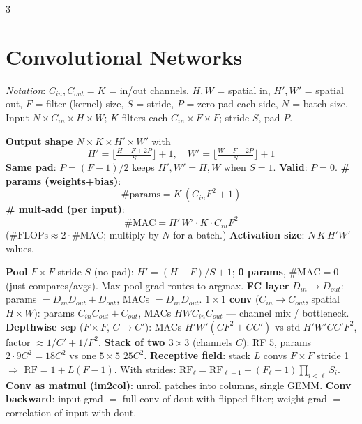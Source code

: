\documentclass[a4paper,9pt,landscape]{scrartcl}
\begin{document}
\begin{multicols*}{3}
\section{Convolutional Networks}
\textit{Notation}: $C_{in},C_{out}{=}K$ = in/out channels, $H,W$ = spatial in, $H',W'$ = spatial out, $F$ = filter (kernel) size, $S$ = stride, $P$ = zero-pad each side, $N$ = batch size.
Input $N\!\times\!C_{in}\!\times\!H\!\times\!W$; $K$ filters each $C_{in}\!\times\!F\!\times\!F$; stride $S$, pad $P$.

\textbf{Output shape} $N\!\times\!K\!\times\!H'\!\times\!W'$ with
$$H'=\Big\lfloor\tfrac{H-F+2P}{S}\Big\rfloor+1,\quad W'=\Big\lfloor\tfrac{W-F+2P}{S}\Big\rfloor+1$$
\textbf{Same pad}: $P=(F{-}1)/2$ keeps $H',W'{=}H,W$ when $S{=}1$. \textbf{Valid}: $P{=}0$.
\textbf{\# params (weights+bias)}:
$$\#\text{params}=K\,(C_{in}F^2+1)$$
\textbf{\# mult-add (per input)}:
$$\#\text{MAC}=H'\,W'\cdot K\cdot C_{in}F^2$$
($\#\text{FLOPs}\!\approx\!2\cdot\#\text{MAC}$; multiply by $N$ for a batch.)
\textbf{Activation size}: $N\,K\,H'W'$ values.

\textbf{Pool} $F\!\times\!F$ stride $S$ (no pad): $H'{=}(H{-}F)/S+1$; \textbf{0 params}, $\#\text{MAC}{=}0$ (just compares/avgs). Max-pool grad routes to argmax.
\textbf{FC layer} $D_{in}\!\to\!D_{out}$: params $=D_{in}D_{out}+D_{out}$, MACs $=D_{in}D_{out}$.
\textbf{$1{\times}1$ conv} ($C_{in}\!\to\!C_{out}$, spatial $H\!\times\!W$): params $C_{in}C_{out}+C_{out}$, MACs $H W C_{in}C_{out}$ — channel mix / bottleneck.
\textbf{Depthwise sep} ($F{\times}F$, $C{\to}C'$): MACs $H'W'(C F^2+CC')$ vs std $H'W'CC'F^2$, factor $\approx 1/C'+1/F^2$.
\textbf{Stack of two $3{\times}3$} (channels $C$): RF $5$, params $2\!\cdot\!9C^2{=}18C^2$ vs one $5{\times}5$ $25C^2$.
\textbf{Receptive field}: stack $L$ convs $F\!\times\!F$ stride 1 $\Rightarrow$ $\text{RF}{=}1+L(F{-}1)$. With strides: $\text{RF}_\ell{=}\text{RF}_{\ell-1}+(F_\ell{-}1)\!\prod_{i<\ell}S_i$.
\textbf{Conv as matmul (im2col)}: unroll patches into columns, single GEMM.
\textbf{Conv backward}: input grad $=$ full-conv of dout with flipped filter; weight grad $=$ correlation of input with dout.


\end{multicols*}
\end{document}

